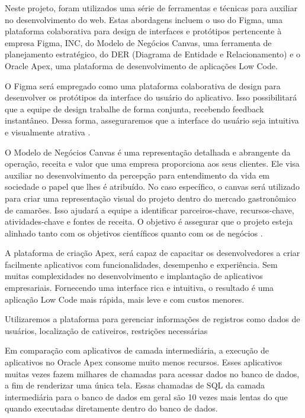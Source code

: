 Neste projeto, foram utilizados uma série de ferramentas e técnicas para auxiliar no desenvolvimento do web. Estas abordagens incluem o uso do Figma, uma plataforma colaborativa para design de interfaces e protótipos pertencente à empresa Figma, INC, do Modelo de Negócios Canvas, uma ferramenta de planejamento estratégico, do DER (Diagrama de Entidade e Relacionamento) e o Oracle Apex, uma plataforma de desenvolvimento de aplicações Low Code.

O Figma será empregado como uma plataforma colaborativa de design para desenvolver os protótipos da interface do usuário do aplicativo. Isso possibilitará que a equipe de design trabalhe de forma conjunta, recebendo feedback instantâneo. Dessa forma, asseguraremos que a interface do usuário seja intuitiva e visualmente atrativa \cite{lopes2023}. 

O Modelo de Negócios Canvas é uma representação detalhada e abrangente da operação, receita e valor que uma empresa proporciona aos seus clientes. Ele visa auxiliar no desenvolvimento da percepção para entendimento da vida em sociedade o papel que lhes é atribuído. No caso específico, o canvas será utilizado para criar uma representação visual do projeto dentro do mercado gastronômico de camarões. Isso ajudará a equipe a identificar parceiros-chave, recursos-chave, atividades-chave e fontes de receita. O objetivo é assegurar que o projeto esteja alinhado tanto com os objetivos científicos quanto com os de negócios \cite{biava2017}. 

A plataforma de criação Apex, será capaz de capacitar os desenvolvedores a criar facilmente aplicativos com funcionalidades, desempenho e experiência. Sem muitas complexidades no desenvolvimento e implantação de aplicativos empresariais. Fornecendo uma interface rica e intuitiva, o resultado é uma aplicação Low Code mais rápida, mais leve e com custos menores. 

Utilizaremos a plataforma para gerenciar informações de registros como dados de usuários, localização de cativeiros, restrições necessárias 

Em comparação com aplicativos de camada intermediária, a execução de aplicativos no Oracle Apex consome muito menos recursos. Esses aplicativos muitas vezes fazem milhares de chamadas para acessar dados no banco de dados, a fim de renderizar uma única tela. Essas chamadas de SQL da camada intermediária para o banco de dados em geral são 10 vezes mais lentas do que quando executadas diretamente dentro do banco de dados. 

